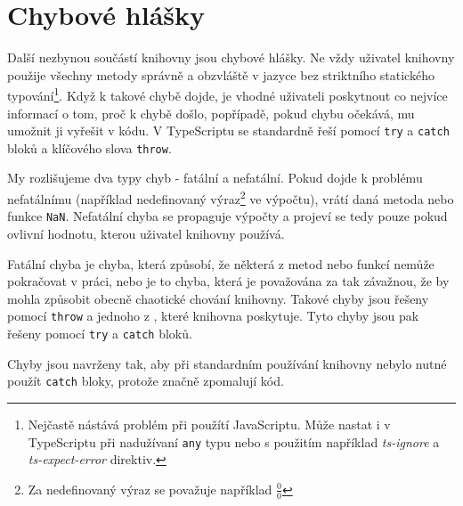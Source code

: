 \chapter{Chybové hlášky}
\label{chap:error-messages}

Další nezbynou součástí knihovny jsou chybové hlášky.
Ne vždy uživatel knihovny použije všechny metody správně a obzvláště v jazyce bez striktního statického typování\footnote{Nejčastě nástává problém při použítí JavaScriptu. Může nastat i v TypeScriptu při nadužívaní \texttt{any} typu nebo s použitím například \textit{ts-ignore} a \textit{ts-expect-error} direktiv.}.
Když k takové chybě dojde, je vhodné uživateli poskytnout co nejvíce informací o tom, proč k chybě došlo, popřípadě, pokud chybu očekává, mu umožnit ji vyřešit v kódu.
V TypeScriptu se  standardně řeší pomocí \texttt{try} a \texttt{catch} bloků a klíčového slova \texttt{throw}\cite{mdn:try-catch}.

My rozlišujeme dva typy chyb - fatální a nefatální. Pokud dojde k problému nefatálnímu (například nedefinovaný výraz\footnote{Za nedefinovaný výraz se považuje například $\frac{0}{0}$} ve výpočtu), vrátí daná metoda nebo funkce \texttt{NaN}\cite{geometryjs:wiki:errors}.
Nefatální chyba se propaguje výpočty a projeví se tedy pouze pokud ovlivní hodnotu, kterou uživatel knihovny používá\cite{geometryjs:wiki:errors}.

Fatální chyba je chyba, která způsobí, že některá z metod nebo funkcí nemůže pokračovat v práci, nebo je to chyba, která je považována za tak závažnou, že by mohla způsobit obecně chaotické chování knihovny.
Takové chyby jsou řešeny pomocí \texttt{throw} a jednoho z , které knihovna poskytuje.
Tyto chyby jsou pak řešeny pomocí \texttt{try} a \texttt{catch} bloků.

Chyby jsou navrženy tak, aby při standardním používání knihovny nebylo nutné použít \texttt{catch} bloky\cite{geometryjs:wiki:errors}, protože značně zpomalují kód\cite{stackoverflow:try-catch-performance:2013}.